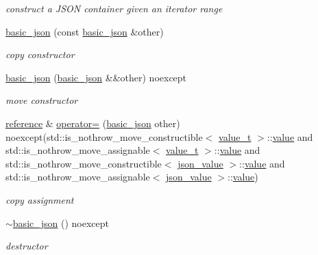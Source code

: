 \begin{DoxyCompactItemize}
\begin{DoxyCompactList}\small\item\em construct a J\+S\+ON container given an iterator range \end{DoxyCompactList}\item 
\hyperlink{classnlohmann_1_1basic__json_af5de621bcf646c332343f9c1e011126c}{basic\+\_\+json} (const \hyperlink{classnlohmann_1_1basic__json}{basic\+\_\+json} \&other)
\begin{DoxyCompactList}\small\item\em copy constructor \end{DoxyCompactList}\item 
\hyperlink{classnlohmann_1_1basic__json_a9a06d1efd50a00f4889f831f851ce124}{basic\+\_\+json} (\hyperlink{classnlohmann_1_1basic__json}{basic\+\_\+json} \&\&other) noexcept
\begin{DoxyCompactList}\small\item\em move constructor \end{DoxyCompactList}\item 
\hyperlink{classnlohmann_1_1basic__json_ac6a5eddd156c776ac75ff54cfe54a5bc}{reference} \& \hyperlink{classnlohmann_1_1basic__json_aab256df8c5594ec693035822fa1e2904}{operator=} (\hyperlink{classnlohmann_1_1basic__json}{basic\+\_\+json} other) noexcept(std\+::is\+\_\+nothrow\+\_\+move\+\_\+constructible$<$ \hyperlink{namespacenlohmann_1_1detail_a1ed8fc6239da25abcaf681d30ace4985}{value\+\_\+t} $>$\+::\hyperlink{classnlohmann_1_1basic__json_adcf8ca5079f5db993820bf50036bf45d}{value} and std\+::is\+\_\+nothrow\+\_\+move\+\_\+assignable$<$ \hyperlink{namespacenlohmann_1_1detail_a1ed8fc6239da25abcaf681d30ace4985}{value\+\_\+t} $>$\+::\hyperlink{classnlohmann_1_1basic__json_adcf8ca5079f5db993820bf50036bf45d}{value} and std\+::is\+\_\+nothrow\+\_\+move\+\_\+constructible$<$ \hyperlink{unionnlohmann_1_1basic__json_1_1json__value}{json\+\_\+value} $>$\+::\hyperlink{classnlohmann_1_1basic__json_adcf8ca5079f5db993820bf50036bf45d}{value} and std\+::is\+\_\+nothrow\+\_\+move\+\_\+assignable$<$ \hyperlink{unionnlohmann_1_1basic__json_1_1json__value}{json\+\_\+value} $>$\+::\hyperlink{classnlohmann_1_1basic__json_adcf8ca5079f5db993820bf50036bf45d}{value})
\begin{DoxyCompactList}\small\item\em copy assignment \end{DoxyCompactList}\item 
\hyperlink{classnlohmann_1_1basic__json_aba01953d5d90e676d504863b8d9fdde5}{$\sim$basic\+\_\+json} () noexcept
\begin{DoxyCompactList}\small\item\em destructor \end{DoxyCompactList}\end{DoxyCompactItemize}
